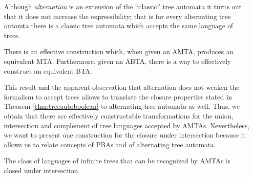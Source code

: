 Although \emph{alternation} is an extension of the \enquote{classic} tree 
automata it turns out that it does not increase the expressibility; that is
for every alternating tree automta there is a classic tree automata which 
accepts the same language of trees.
\begin{theorem}
  \cite[Theorem 1.2]{SimAltTreeAuto}
  There is an effective construction which, when given an \ac{AMTA}, produces 
  an equivalent \ac{MTA}. Furthermore, given an \ac{ABTA}, there is a way to 
  effectively construct an equivalent \ac{BTA}.
  \label{thm:treesimulation}
\end{theorem}
This result and the apparent observation that alternation does not weaken the 
formalism to accept trees allows to translate the closure properties stated in 
Theorem \ref{thm:treeautoboolean} to alternating tree automata as well. Thus, 
we obtain that there are effectively constructable transformations for the 
union, intersection and complement of tree languages accepted by \acp{AMTA}. 
Nevertheless, we want to present one construction for the closure under 
intersection because it allows us to relate concepts of \acp{PBA} and of
alternating tree automata.
\begin{corollary}
  The class of languages of infinite trees that can be recognized by \acp{AMTA}
  is closed under intersection.
  \label{cor:treeintersection}
\end{corollary}
